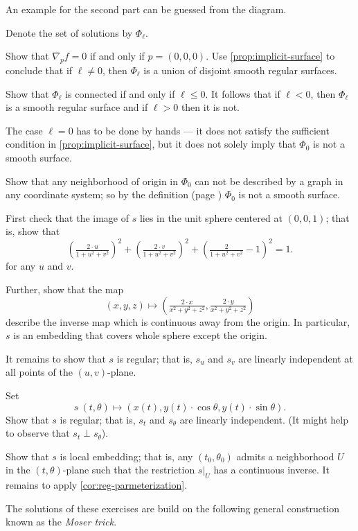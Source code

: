 An example for the second part can be guessed from the diagram.

Denote the set of solutions by $\Phi_\ell$.

Show that $\nabla_p f=0$ if and only if $p=(0,0,0)$.
Use \ref{prop:implicit-surface} to conclude that if $\ell\ne 0$, then $\Phi_\ell$ is a union of disjoint smooth regular surfaces.

Show that $\Phi_\ell$ is connected if and only if $\ell\le 0$.
It follows that if $\ell<0$, then $\Phi_\ell$ is a smooth regular surface and if $\ell>0$ then it is not.

The case $\ell=0$ has to be done by hands --- it does not satisfy the sufficient condition in \ref{prop:implicit-surface}, but it does not solely imply that $\Phi_0$ is not a smooth surface.

Show that any neighborhood of origin in $\Phi_0$ can not be described by a graph in any coordinate system;
so by the definition (page \pageref{page:def-smooth-surface}) $\Phi_0$ is not a smooth surface.

First check that the image of $s$ lies in the unit sphere centered at $(0,0,1)$;
that is, show that 
\[\left(\tfrac{2\cdot u}{1+u^2+v^2}\right)^2
+
\left(\tfrac{2\cdot v}{1+u^2+v^2}\right)^2
+\left(\tfrac{2}{1+u^2+v^2}-1\right)^2=1.\]
for any $u$ and $v$.

Further, show that the map 
\[(x,y,z)\mapsto (\tfrac{2\cdot x}{x^2+y^2+z^2},\tfrac{2\cdot y}{x^2+y^2+z^2})\]
describe the inverse map which is continuous away from the origin.
In particular, $s$ is an embedding that covers whole sphere except the origin.

It remains to show that $s$ is regular; that is, $s_u$ and $s_v$ are linearly independent at all points of the $(u,v)$-plane.

Set
\[s\:(t,\theta)\mapsto (x(t), y(t)\cdot\cos\theta,y(t)\cdot\sin\theta).\]
Show that $s$ is regular; that is, $s_t$ and $s_\theta$ are linearly independent.
(It might help to observe that $s_t\perp s_\theta$).

Show that $s$ is local embedding; that is, any $(t_0,\theta_0)$ admits a neighborhood $U$ in the $(t,\theta)$-plane such that the restriction $s|_U$ has a continuous inverse.
It remains to apply \ref{cor:reg-parmeterization}.

The solutions of these exercises are build on the following general construction known as the \emph{Moser trick}.

